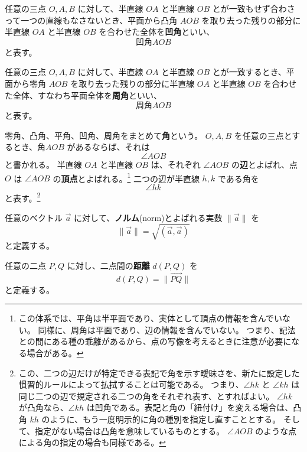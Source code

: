 \begin{dfn}[凹角]
  任意の三点 \(O,A,B\) に対して、半直線 \(OA\) と半直線 \(OB\) とが一致もせず合わさって一つの直線もなさないとき、平面から凸角 \(AOB\) を取り去った残りの部分に半直線 \(OA\) と半直線 \(OB\) を合わせた全体を\textbf{凹角}といい、
  \[\text{凹角} AOB\]
  と表す。
\end{dfn}

\begin{dfn}[周角]
  任意の三点 \(O,A,B\) に対して、半直線 \(OA\) と半直線 \(OB\) とが一致するとき、平面から零角 \(AOB\) を取り去った残りの部分に半直線 \(OA\) と半直線 \(OB\) を合わせた全体、すなわち平面全体を\textbf{周角}といい、
  \[\text{周角} AOB\]
  と表す。
\end{dfn}

\begin{dfn}[角、辺、頂点]
  零角、凸角、平角、凹角、周角をまとめて\textbf{角}という。
  \(O,A,B\) を任意の三点とするとき、\(\text{角} AOB\) があるならば、それは
  \[\angle AOB\]
  と書かれる。
  半直線 \(OA\) と半直線 \(OB\) は、それぞれ \(\angle AOB\) の\textbf{辺}とよばれ、点 \(O\) は \(\angle AOB\) の\textbf{頂点}とよばれる。\footnote{この体系では、平角は半平面であり、実体として頂点の情報を含んでいない。
  同様に、周角は平面であり、辺の情報を含んでいない。
  つまり、記法との間にある種の乖離があるから、点の写像を考えるときに注意が必要になる場合がある。}
  二つの辺が半直線 \(h,k\) である角を
  \[\angle hk\]
  と表す。\footnote{この、二つの辺だけが特定できる表記で角を示す曖昧さを、新たに設定した慣習的ルールによって払拭することは可能である。
  つまり、\(\angle hk\) と \(\angle kh\) は同じ二つの辺で規定される二つの角をそれぞれ表す、とすればよい。
  \(\angle hk\) が凸角なら、\(\angle kh\) は凹角である。表記と角の「紐付け」を変える場合は、凸角 \(kh\) のように、もう一度明示的に角の種別を指定し直すこととする。
  そして、指定がない場合は凸角を意味しているものとする。
  \(\angle AOB\) のような点による角の指定の場合も同様である。}
\end{dfn}

\begin{dfn}[ノルム]
  任意のベクトル \(\vec{a}\) に対して、\textbf{ノルム}(norm)とよばれる実数 \(\|\vec{a}\|\) を
  \[\|\vec{a}\|=\sqrt{(\vec{a},\vec{a})}\]
  と定義する。
\end{dfn}

\begin{dfn}[距離]
  任意の二点 \(P,Q\) に対し、二点間の\textbf{距離} \(d(P,Q)\) を
  \[d(P,Q)=\|\overrightarrow{PQ}\|\]
  と定義する。
\end{dfn}

